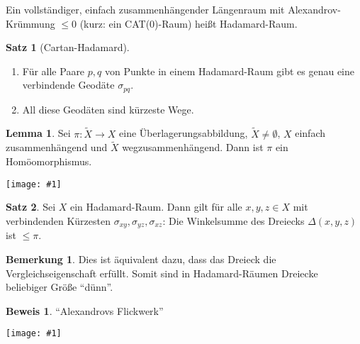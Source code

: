 \documentclass{beamer}
\renewcommand{\emph}[1]{\textcolor{Emph}{#1}}
\theoremstyle{definition}
\newtheorem*{satz}{Satz}
\newtheorem*{lem}{Lemma}
\newtheorem*{bem}{Bemerkung}
\newtheorem*{bew}{Beweis}
\newcommand{\framedgraphic}[1] {
  \begin{frame}
    \begin{center}
      \vspace{-10pt}
      \texttt{[image: \#1]}
    \end{center}
  \end{frame}
}
\begin{document}
\begin{frame}
  \begin{definition}
    Ein vollständiger, einfach zusammenhängender Längenraum mit Alexandrov-Krümmung $\leq 0$ (kurz: ein CAT($0$)-Raum) heißt \emph{Hadamard-Raum}.
  \end{definition}

  \begin{satz}[Cartan-Hadamard]
    \begin{enumerate}
      \item Für alle Paare $p, q$ von Punkte in einem Hadamard-Raum gibt es genau eine verbindende Geodäte $\sigma_{pq}$.
      \item All diese Geodäten sind kürzeste Wege.
    \end{enumerate}
  \end{satz}

  \begin{lem}
    Sei $\pi : \tilde{X} \to X$ eine Überlagerungsabbildung, $\tilde{X} \not= \emptyset$, $X$ einfach zusammenhängend und $\tilde{X}$ wegzusammenhängend. Dann ist $\pi$ ein Homöomorphismus.
  \end{lem}
\end{frame}


\framedgraphic{bilder/Picture15.jpg}

\begin{frame}
  \begin{satz}
    Sei $X$ ein Hadamard-Raum. Dann gilt für alle $x, y, z \in X$ mit verbindenden Kürzesten $\sigma_{xy}, \sigma_{yz}, \sigma_{xz}$: Die Winkelsumme des Dreiecks $\Delta (x, y, z)$ ist $\leq \pi$.
  \end{satz}

  \begin{bem}
    Dies ist äquivalent dazu, dass das Dreieck die Vergleichseigenschaft erfüllt. Somit sind in Hadamard-Räumen Dreiecke beliebiger Größe "`dünn"'.
  \end{bem}

  \begin{bew}
    "`Alexandrovs Flickwerk"'
  \end{bew}
\end{frame}

\framedgraphic{bilder/cat.jpg}
\end{document}
